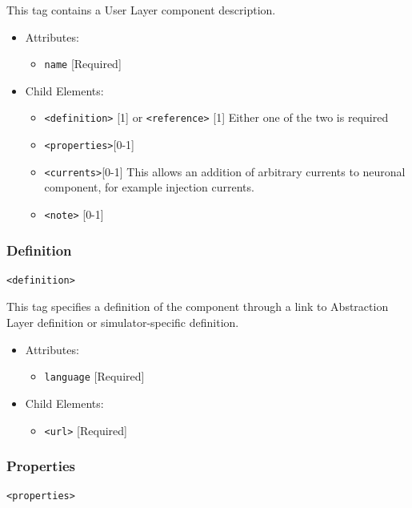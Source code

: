 \documentclass{article}
\begin{document}
This tag contains a User Layer component description.

\begin{itemize}
\item Attributes:
%
\begin{itemize}
\item \verb|name| {[}Required{]}
\end{itemize}

\item Child Elements:
%
\begin{itemize}
\item \verb|<definition>| {[}1{]} or \verb|<reference>| {[}1{]} Either one
of the two is required
\item \verb|<properties>|{[}0-1{]}
\item \verb|<currents>|{[}0-1{]}  This allows an addition of arbitrary currents
to
neuronal component, for example injection currents.
\item \verb|<note>| {[}0-1{]}
\end{itemize}

\end{itemize}

\subsubsection{Definition}
%
\begin{lstlisting}
<definition>
\end{lstlisting}

This tag specifies a definition of the component through a link to Abstraction
Layer definition or simulator-specific definition.

\begin{itemize}
\item Attributes:
%
\begin{itemize}
\item \verb|language| {[}Required{]}
\end{itemize}

\item Child Elements:
%
\begin{itemize}
\item \verb|<url>| {[}Required{]}
\end{itemize}

\end{itemize}

\subsubsection{Properties}
%
\begin{lstlisting}
<properties>
\end{lstlisting}
\end{document}
